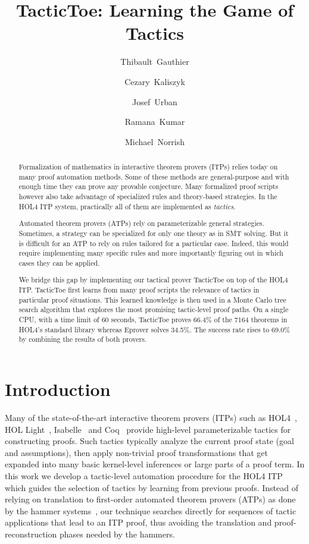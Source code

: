 \documentclass[runningheads,a4paper,draft]{svjour3}
\title{TacticToe: Learning the Game of Tactics}
\author{\mbox{Thibault Gauthier} \and \mbox{Cezary Kaliszyk} \and \mbox{Josef
Urban} \and \mbox{Ramana Kumar} \and \mbox{Michael Norrish}}
\institute{Thibault Gauthier and Cezary Kaliszyk \at
Department of Computer Science, University of Innsbruck,
Innsbruck, Austria\\ \url{{thibault.gauthier,cezary.kaliszyk}@uibk.ac.at}
\and
Josef Urban \at Czech Technical University, Prague\\\url{josef.urban@gmail.com}
\and Ramana Kumar and Michael Norrish \at Data61}
\newcommand{\todoi}[1]{\todo[inline]{#1}}
\def\holfour{\textsf{HOL4}\xspace}
\def\isabelle{\textsf{Isabelle}\xspace}
\def\hollight{\textsf{HOL Light}\xspace}
\def\coq{\textsf{Coq}\xspace}
\begin{document}
\maketitle

\begin{abstract}
Formalization of mathematics in interactive theorem provers (ITPs) relies today on many proof automation methods.
Some of these methods are general-purpose and with enough time they can prove any provable conjecture.
Many formalized proof scripts however also take advantage of specialized rules and theory-based strategies.
In the HOL4 ITP system, practically all of them are implemented as \emph{tactics}.

Automated theorem provers (ATPs) rely on parameterizable general
strategies. Sometimes, a strategy can be specialized for only one theory as in
SMT solving. But it is difficult for an ATP to rely on rules tailored for a particular case.
Indeed, this would require implementing many specific rules and more
importantly figuring out in which cases they can be applied.

We bridge this gap by implementing our tactical prover TacticToe on top
of the HOL4 ITP.
TacticToe first learns from many proof scripts
the relevance of tactics in particular proof situations.
This learned knowledge is then used in a Monte Carlo tree search algorithm that explores the most promising tactic-level proof paths.
On a single CPU, with a time limit of 60 seconds, TacticToe proves 66.4\%
of the 7164 theorems in HOL4's standard library whereas
Eprover solves 34.5\%. The success rate rises to 69.0\% by combining the
results of both provers.
\end{abstract}

\tableofcontents
\todoi{Comparison with hammers in usability}

\section{Introduction}

Many of the state-of-the-art interactive theorem provers (ITPs) such as
  \holfour~\cite{hol4}, \hollight~\cite{Harrison09hollight},
  \isabelle~\cite{isabelle}
  and \coq~\cite{coq-book} provide high-level parameterizable tactics for constructing proofs.
  Such tactics typically analyze the current proof state (goal and
  assumptions), then apply non-trivial proof transformations that get
  expanded into many basic kernel-level inferences or large parts of a proof term.
  In this work we develop a tactic-level automation procedure for the \holfour ITP
  which guides the selection of tactics by learning from previous
  proofs.  Instead of relying on translation to first-order automated
  theorem provers (ATPs) as done by the hammer
  systems~\cite{hammers4qed,tgck-cpp15}, our technique
  searches directly for sequences of tactic applications that lead to
  an ITP proof, thus avoiding the translation and proof-reconstruction phases needed by the hammers.
\end{document}
